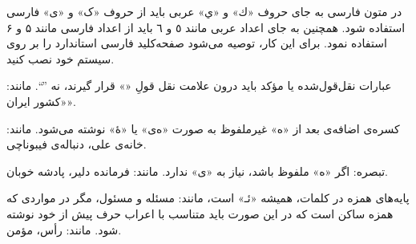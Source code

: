 
\begin{شمارش}

\item
در متون فارسی به جای حروف «ك» و «ي» عربی باید از حروف «ک» و «ی» فارسی استفاده شود. همچنین به جای اعداد عربی مانند ٥ و ٦ باید از اعداد فارسی مانند ۵ و ۶ استفاده نمود.
برای این کار، توصیه می‌شود صفحه‌کلید‌ فارسی استاندارد را بر روی سیستم خود نصب کنید.
\item
عبارات نقل‌قول‌شده یا مؤکد باید درون علامت نقل قولِ «» قرار گیرند، نه ''``. مانند: «کشور ایران».
\item
کسره‌ی اضافه‌ی بعد از «ه» غیرملفوظ به صورت «ه‌ی» یا «هٔ» نوشته می‌شود. مانند: خانه‌ی علی، دنباله‌ی فیبوناچی.

        تبصره‌: اگر «ه» ملفوظ باشد، نیاز به «‌ی» ندارد. مانند: فرمانده دلیر، پادشه خوبان.

\item
پایه‌های همزه در کلمات، همیشه «ئـ» است، مانند: مسئله و مسئول، مگر در مواردی که همزه ساکن است که در این ‌صورت باید متناسب با اعراب حرف پیش از خود نوشته شود. مانند: رأس، مؤمن.

\end{شمارش}



